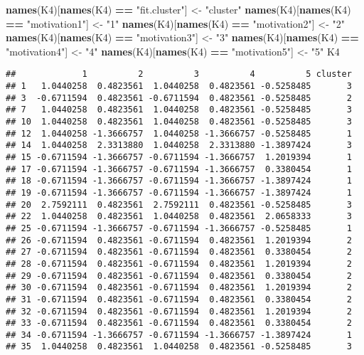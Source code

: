 \documentclass[]{article}
\newenvironment{Shaded}{\begin{snugshade}}{\end{snugshade}}
\newcommand{\KeywordTok}[1]{\textcolor[rgb]{0.13,0.29,0.53}{\textbf{#1}}}
\newcommand{\NormalTok}[1]{#1}
\newcommand{\OperatorTok}[1]{\textcolor[rgb]{0.81,0.36,0.00}{\textbf{#1}}}
\newcommand{\StringTok}[1]{\textcolor[rgb]{0.31,0.60,0.02}{#1}}
\begin{document}
\begin{Shaded}
\begin{Highlighting}[]
\KeywordTok{names}\NormalTok{(K4)[}\KeywordTok{names}\NormalTok{(K4) }\OperatorTok{==}\StringTok{ "fit.cluster"}\NormalTok{] <-}\StringTok{ "cluster"}
\KeywordTok{names}\NormalTok{(K4)[}\KeywordTok{names}\NormalTok{(K4) }\OperatorTok{==}\StringTok{ "motivation1"}\NormalTok{] <-}\StringTok{ "1"}
\KeywordTok{names}\NormalTok{(K4)[}\KeywordTok{names}\NormalTok{(K4) }\OperatorTok{==}\StringTok{ "motivation2"}\NormalTok{] <-}\StringTok{ "2"}
\KeywordTok{names}\NormalTok{(K4)[}\KeywordTok{names}\NormalTok{(K4) }\OperatorTok{==}\StringTok{ "motivation3"}\NormalTok{] <-}\StringTok{ "3"}
\KeywordTok{names}\NormalTok{(K4)[}\KeywordTok{names}\NormalTok{(K4) }\OperatorTok{==}\StringTok{ "motivation4"}\NormalTok{] <-}\StringTok{ "4"}
\KeywordTok{names}\NormalTok{(K4)[}\KeywordTok{names}\NormalTok{(K4) }\OperatorTok{==}\StringTok{ "motivation5"}\NormalTok{] <-}\StringTok{ "5"}
\NormalTok{K4}
\end{Highlighting}
\end{Shaded}

\begin{verbatim}
##             1          2          3          4          5 cluster
## 1   1.0440258  0.4823561  1.0440258  0.4823561 -0.5258485       3
## 3  -0.6711594  0.4823561 -0.6711594  0.4823561 -0.5258485       2
## 7   1.0440258  0.4823561  1.0440258  0.4823561 -0.5258485       3
## 10  1.0440258  0.4823561  1.0440258  0.4823561 -0.5258485       3
## 12  1.0440258 -1.3666757  1.0440258 -1.3666757 -0.5258485       1
## 14  1.0440258  2.3313880  1.0440258  2.3313880 -1.3897424       3
## 15 -0.6711594 -1.3666757 -0.6711594 -1.3666757  1.2019394       1
## 17 -0.6711594 -1.3666757 -0.6711594 -1.3666757  0.3380454       1
## 18 -0.6711594 -1.3666757 -0.6711594 -1.3666757 -1.3897424       1
## 19 -0.6711594 -1.3666757 -0.6711594 -1.3666757 -1.3897424       1
## 20  2.7592111  0.4823561  2.7592111  0.4823561 -0.5258485       3
## 22  1.0440258  0.4823561  1.0440258  0.4823561  2.0658333       3
## 25 -0.6711594 -1.3666757 -0.6711594 -1.3666757 -0.5258485       1
## 26 -0.6711594  0.4823561 -0.6711594  0.4823561  1.2019394       2
## 27 -0.6711594  0.4823561 -0.6711594  0.4823561  0.3380454       2
## 28 -0.6711594  0.4823561 -0.6711594  0.4823561  1.2019394       2
## 29 -0.6711594  0.4823561 -0.6711594  0.4823561  0.3380454       2
## 30 -0.6711594  0.4823561 -0.6711594  0.4823561  1.2019394       2
## 31 -0.6711594  0.4823561 -0.6711594  0.4823561  0.3380454       2
## 32 -0.6711594  0.4823561 -0.6711594  0.4823561  1.2019394       2
## 33 -0.6711594  0.4823561 -0.6711594  0.4823561  0.3380454       2
## 34 -0.6711594 -1.3666757 -0.6711594 -1.3666757 -1.3897424       1
## 35  1.0440258  0.4823561  1.0440258  0.4823561 -0.5258485       3
\end{verbatim}
\end{document}
